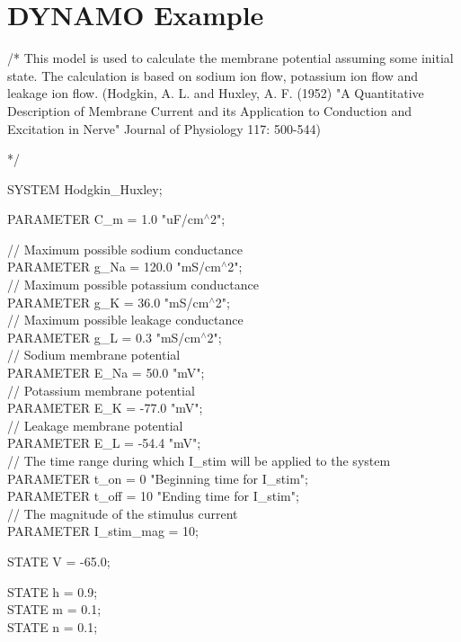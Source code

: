 \newpage
\section{DYNAMO Example}
\label{DYNAMO Example}
\begin{maxipage}
\begin{example}
/*
 This model is used to calculate the membrane potential assuming
 some initial state. The calculation is based on sodium ion flow,
 potassium ion flow and leakage ion flow. (Hodgkin, A. L. and Huxley,
 A. F. (1952) "A Quantitative Description of Membrane Current and its
 Application to Conduction and Excitation in Nerve" Journal of
 Physiology 117: 500-544)

*/

SYSTEM Hodgkin\_Huxley;

PARAMETER  C\_m  = 1.0    "uF/cm$^{\wedge}$2";

// Maximum possible sodium conductance\\
PARAMETER  g\_Na = 120.0  "mS/cm$^{\wedge}$2";\\
// Maximum possible potassium conductance\\
PARAMETER  g\_K  = 36.0   "mS/cm$^{\wedge}$2";\\
// Maximum possible leakage conductance\\
PARAMETER  g\_L  = 0.3    "mS/cm$^{\wedge}$2";\\

// Sodium membrane potential\\
PARAMETER  E\_Na = 50.0	 "mV";\\
// Potassium membrane potential\\
PARAMETER  E\_K  = -77.0	 "mV";\\
// Leakage membrane potential\\
PARAMETER  E\_L  = -54.4	 "mV";\\

// The time range during which I\_stim will be applied to the system  \\
PARAMETER  t\_on = 0    "Beginning time for I\_stim";\\
PARAMETER  t\_off = 10   "Ending time for I\_stim";\\

// The magnitude of the stimulus current\\
PARAMETER  I\_stim\_mag = 10;

STATE V = -65.0;

STATE h = 0.9;\\
STATE m = 0.1;\\
STATE n = 0.1;


\end{example}
\end{maxipage}
